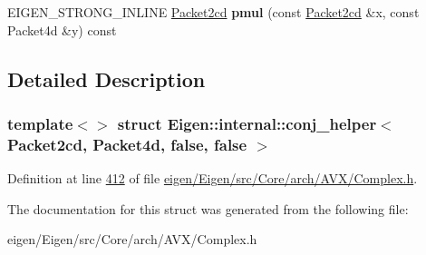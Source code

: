 \begin{DoxyCompactItemize}
\item 
\mbox{\label{struct_eigen_1_1internal_1_1conj__helper_3_01_packet2cd_00_01_packet4d_00_01false_00_01false_01_4_a1d58ade0366784b121425bfadd07fa17}} 
E\+I\+G\+E\+N\+\_\+\+S\+T\+R\+O\+N\+G\+\_\+\+I\+N\+L\+I\+NE \hyperlink{struct_eigen_1_1internal_1_1_packet2cd}{Packet2cd} {\bfseries pmul} (const \hyperlink{struct_eigen_1_1internal_1_1_packet2cd}{Packet2cd} \&x, const Packet4d \&y) const
\end{DoxyCompactItemize}


\subsection{Detailed Description}
\subsubsection*{template$<$$>$\newline
struct Eigen\+::internal\+::conj\+\_\+helper$<$ Packet2cd, Packet4d, false, false $>$}



Definition at line \hyperlink{eigen_2_eigen_2src_2_core_2arch_2_a_v_x_2_complex_8h_source_l00412}{412} of file \hyperlink{eigen_2_eigen_2src_2_core_2arch_2_a_v_x_2_complex_8h_source}{eigen/\+Eigen/src/\+Core/arch/\+A\+V\+X/\+Complex.\+h}.



The documentation for this struct was generated from the following file\+:\begin{DoxyCompactItemize}
\item 
eigen/\+Eigen/src/\+Core/arch/\+A\+V\+X/\+Complex.\+h\end{DoxyCompactItemize}
